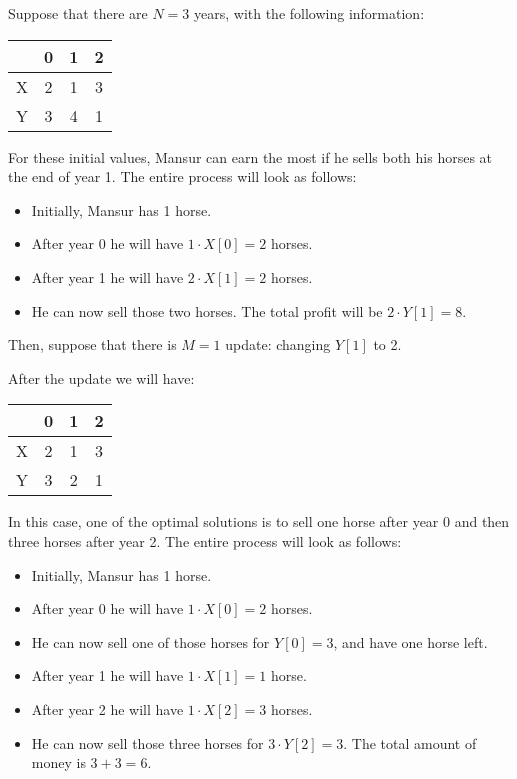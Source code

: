 Suppose that there are $N = 3$ years, with the following information:
\begin{center}
\begin{tabular}{|c|c|c|c|}
\hline
  & 0 & 1 & 2\\
\hline
X & 2 & 1 & 3\\
\hline
Y & 3 & 4 & 1\\
\hline
\end{tabular}
\end{center}

For these initial values, Mansur can earn the most if he sells both his horses at the end of year 1. The entire process will look as follows:
\begin{itemize}
\item Initially, Mansur has 1 horse.
\item After year 0 he will have $1 \cdot X[0] = 2$ horses.
\item After year 1 he will have $2 \cdot X[1] = 2$ horses.
\item He can now sell those two horses. The total profit will be $2 \cdot Y[1] = 8$.
\end{itemize}

Then, suppose that there is $M = 1$ update: changing $Y[1]$ to 2.

After the update we will have:
\begin{center}
\begin{tabular}{|c|c|c|c|}
\hline
  & 0 & 1 & 2\\
\hline
X & 2 & 1 & 3\\
\hline
Y & 3 & 2 & 1\\
\hline
\end{tabular}
\end{center}
In this case, one of the optimal solutions is to sell one horse after year 0 and then three horses after year 2. The entire process will look as follows:
\begin{itemize}
\item Initially, Mansur has 1 horse.
\item After year 0 he will have $1 \cdot X[0] = 2$ horses.
\item He can now sell one of those horses for $Y[0] = 3$, and have one horse left.
\item After year 1 he will have $1 \cdot X[1] = 1$ horse.
\item After year 2 he will have $1 \cdot X[2] = 3$ horses.
\item He can now sell those three horses for $3 \cdot Y[2] = 3$. The total amount of money is $3 + 3 = 6$.
\end{itemize}
